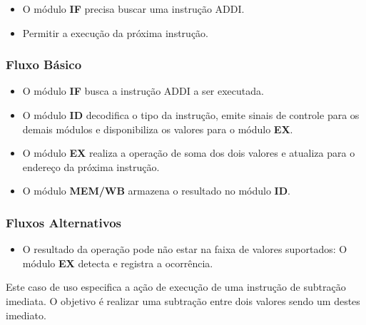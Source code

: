 \preconditions 
\begin{itemize}
	\item O módulo \textbf{IF} precisa buscar uma instrução ADDI.
\end{itemize}

\postconditions
\begin{itemize}
	\item Permitir a execução da próxima instrução.
\end{itemize}

\subsubsection*{Fluxo Básico}
\begin{itemize}
	\item O módulo \textbf{IF} busca a instrução ADDI a ser executada.
	\item O módulo \textbf{ID} decodifica o tipo da instrução, emite sinais de controle para os demais módulos e disponibiliza os valores para o módulo \textbf{EX}.
	\item O módulo \textbf{EX} realiza a operação de soma dos dois valores e atualiza para o endereço da próxima instrução.
	\item O módulo \textbf{MEM/WB} armazena o resultado no módulo \textbf{ID}.
\end{itemize}

\subsubsection*{Fluxos Alternativos}
\begin{itemize}
	\item O resultado da operação pode não estar na faixa de valores suportados:
	\subitem O módulo \textbf{EX} detecta e registra a ocorrência.
\end{itemize}

%		


Este caso de uso especifica a ação de execução de uma instrução de subtração imediata. O objetivo é realizar uma subtração entre dois valores sendo um destes imediato.

